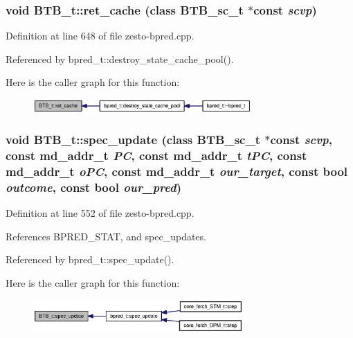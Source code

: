 \subsubsection[{ret\_\-cache}]{\setlength{\rightskip}{0pt plus 5cm}void BTB\_\-t::ret\_\-cache (class {\bf BTB\_\-sc\_\-t} $\ast$const {\em scvp})\hspace{0.3cm}{\tt  [virtual]}}\label{classBTB__t_f22788bee3f764daa978989198adb927}




Definition at line 648 of file zesto-bpred.cpp.

Referenced by bpred\_\-t::destroy\_\-state\_\-cache\_\-pool().

Here is the caller graph for this function:\nopagebreak
\begin{figure}[H]
\begin{center}
\leavevmode
\includegraphics[width=236pt]{classBTB__t_f22788bee3f764daa978989198adb927_icgraph}
\end{center}
\end{figure}
\subsubsection[{spec\_\-update}]{\setlength{\rightskip}{0pt plus 5cm}void BTB\_\-t::spec\_\-update (class {\bf BTB\_\-sc\_\-t} $\ast$const  {\em scvp}, \/  const {\bf md\_\-addr\_\-t} {\em PC}, \/  const {\bf md\_\-addr\_\-t} {\em tPC}, \/  const {\bf md\_\-addr\_\-t} {\em oPC}, \/  const {\bf md\_\-addr\_\-t} {\em our\_\-target}, \/  const bool {\em outcome}, \/  const bool {\em our\_\-pred})\hspace{0.3cm}{\tt  [virtual]}}\label{classBTB__t_2ab69add8d43f5292d48653701050a71}




Definition at line 552 of file zesto-bpred.cpp.

References BPRED\_\-STAT, and spec\_\-updates.

Referenced by bpred\_\-t::spec\_\-update().

Here is the caller graph for this function:\nopagebreak
\begin{figure}[H]
\begin{center}
\leavevmode
\includegraphics[width=227pt]{classBTB__t_2ab69add8d43f5292d48653701050a71_icgraph}
\end{center}
\end{figure}
